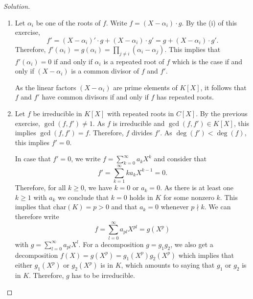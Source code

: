 \documentclass[a4paper,10pt,reqno]{amsart}
\newenvironment{sol}
  {\renewcommand\qedsymbol{$\blacksquare$}\begin{proof}[Solution]}
  {\end{proof}}
\begin{document}
\begin{sol}
\begin{enumerate}[label=(\roman*)]
        \item Let $\alpha_i$ be one of the roots of $f$. Write $f = (X - \alpha_i) \cdot g$.
        By the (i) of this exercise,
        \[
        f' = (X - \alpha_i)' \cdot g + (X - \alpha_i) \cdot g' = g + (X - \alpha_i) \cdot g'.
        \]
        Therefore, $f'(\alpha_i) = g(\alpha_i) = \prod_{j \neq i} (\alpha_i - \alpha_j)$. This implies that $f'(\alpha_i) = 0$ if and only if $\alpha_i$ is a repeated root of $f$ which is the case if and only if $(X - \alpha_i)$ is a common divisor of $f$ and $f'$.

        As the linear factors $(X-\alpha_i)$ are prime elements of $K[X]$, it follows that $f$ and $f'$ have common divisors if and only if $f$ has repeated roots.

        \item Let $f$ be irreducible in $K[X]$ with repeated roots in $C[X]$. By the previous exercise, $\gcd(f,f') \neq 1$. As $f$ is irreducible and $\gcd(f,f') \in K[X]$, this implies $\gcd(f,f') = f$. Therefore, $f$ divides $f'$. As $\deg(f') < \deg(f)$, this implies $f' = 0$.

        In case that $f' = 0$, we write $f = \sum_{k=0}^{\infty}a_kX^k$ and consider that
        \[
        f' = \sum_{k=1}^{\infty} ka_kX^{k-1} = 0.
        \]
        Therefore, for all $k \geq 0$, we have $k = 0$ or $a_k = 0$. As there is at least one $k \geq 1$ with $a_k$ we conclude that $k = 0$ holds in $K$ for some nonzero $k$. This implies that  $\mathrm{char}(K) = p > 0$ and that $a_k = 0$ whenever $p \nmid k$. We can therefore write
        \[
        f = \sum_{l = 0}^{\infty} a_{pl}X^{pl} = g(X^p)
        \]
        with $g = \sum_{l=0}^{\infty} a_{pl}X^l$. For a decomposition $g = g_1g_2$, we  also get a decomposition $f(X) = g(X^p) = g_1(X^p)g_2(X^p)$ which implies that either $g_1(X^p)$ or $g_2(X^p)$ is in $K$, which amounts to saying that $g_1$ or $g_2$ is in $K$. Therefore, $g$ has to be irreducible.
    \end{enumerate}
    
\end{sol}
\end{document}
